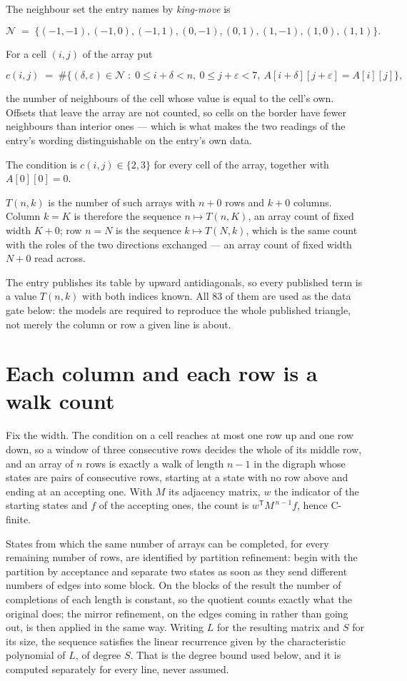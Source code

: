 \documentclass[11pt]{article}
\theoremstyle{definition}
\begin{document}
The neighbour set the entry names by {\itshape king-move} is

\[\mathcal{N} \;=\; \{(-1,-1), (-1,0), (-1,1), (0,-1), (0,1), (1,-1), (1,0), (1,1)\}.\]

For a cell $(i,j)$ of the array put

\[c(i,j) \;=\; \#\bigl\{(\delta,\varepsilon)\in\mathcal{N} \;:\; 0\le i+\delta<n,\ 0\le j+\varepsilon<7,\ A[i+\delta][j+\varepsilon] = A[i][j]\bigr\},\]

the number of neighbours of the cell whose value is equal to the cell's own. Offsets that leave the array are not counted, so cells on the border have fewer neighbours than interior ones --- which is what makes the two readings of the entry's wording distinguishable on the entry's own data.

The condition is $c(i,j) \in \{2, 3\}$ for every cell of the array, together with $A[0][0]=0$.

$T(n,k)$ is the number of such arrays with $n + 0$ rows and $k + 0$ columns. Column $k = K$ is therefore the sequence $n \mapsto T(n,K)$, an array count of fixed width $K + 0$; row $n = N$ is the sequence $k \mapsto T(N,k)$, which is the same count with the roles of the two directions exchanged --- an array count of fixed width $N + 0$ read across.

The entry publishes its table by upward antidiagonals, so every published term is a value $T(n,k)$ with both indices known. All 83 of them are used as the data gate below: the models are required to reproduce the whole published triangle, not merely the column or row a given line is about.

\section{Each column and each row is a walk count}

Fix the width. The condition on a cell reaches at most one row up and one row down, so a window of three consecutive rows decides the whole of its middle row, and an array of $n$ rows is exactly a walk of length $n-1$ in the digraph whose states are pairs of consecutive rows, starting at a state with no row above and ending at an accepting one. With $M$ its adjacency matrix, $w$ the indicator of the starting states and $f$ of the accepting ones, the count is $w^{\mathsf T}M^{\,n-1}f$, hence C-finite.

States from which the same number of arrays can be completed, for every remaining number of rows, are identified by partition refinement: begin with the partition by acceptance and separate two states as soon as they send different numbers of edges into some block. On the blocks of the result the number of completions of each length is constant, so the quotient counts exactly what the original does; the mirror refinement, on the edges coming in rather than going out, is then applied in the same way. Writing $L$ for the resulting matrix and $S$ for its size, the sequence satisfies the linear recurrence given by the characteristic polynomial of $L$, of degree $S$. That is the degree bound used below, and it is computed separately for every line, never assumed.
\end{document}
